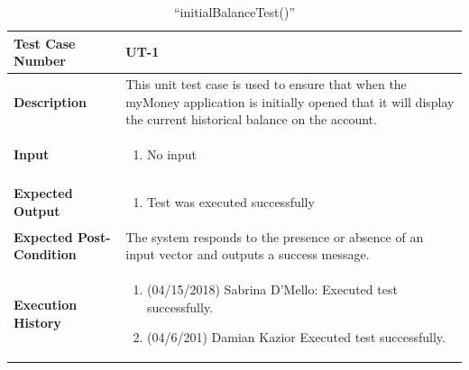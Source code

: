 \documentclass[12pt]{article}
\begin{document}
\begin{table}[H]
\caption{“initialBalanceTest()”}
\begin{center}
\begin{tabular}{|p{5.5cm}|p{11cm}|}
  \hline
  \bf Test Case Number & UT-1\\\hline
  \bf Description & 
  This unit test case is used to ensure that when the myMoney application is initially opened that it will display the current historical balance on the account.\\\hline
  \bf Input &
  \begin{enumerate}
  \item No input
  \end{enumerate}
  \\\hline
  \bf Expected Output &
  \begin{enumerate}
  \item Test was executed successfully
  \end{enumerate}
  \\\hline
  \bf Expected Post-Condition & 
  The system responds to the presence or absence of an input vector and outputs a success message.
  \\\hline   
  \bf Execution History & 
  \begin{enumerate}
  \item (04/15/2018) Sabrina D’Mello: Executed test successfully.
  \item (04/6/201) Damian Kazior Executed test successfully.
  \end{enumerate}
  \\\hline
\end{tabular}
\end{center}
\end{table}
\end{document}
